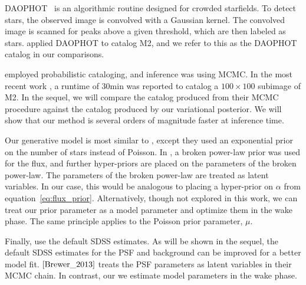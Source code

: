 DAOPHOT~\cite{stetson2987daophot} is an algorithmic routine designed for crowded starfields. To detect stars, the observed image is convolved with a Gaussian kernel. The convolved image is scanned for peaks above a given threshold, which are then labeled as stars. \cite{An_2008_m2} applied DAOPHOT to catalog M2, and we refer to this as the DAOPHOT catalog in our comparisons. 

\cite{Brewer_2013, Portillo_2017, Feder_2019} employed probabilistic cataloging, and inference was using MCMC. In the most recent work \cite{Feder_2019}, a runtime of 30min was reported to catalog a $100 \times 100$ subimage of M2. In the sequel, we will compare the catalog produced from their MCMC procedure against the catalog produced by our variational posterior. We will show that our method is several orders of magnitude faster at inference time. 

Our generative model is most similar to \cite{Portillo_2017, Feder_2019}, except they used an exponential prior on the number of stars instead of Poisson. 
In \cite{Brewer_2013}, a broken power-law prior was used for the flux, and further hyper-priors are placed on the parameters of the broken power-law. The parameters of the broken power-law are treated as latent variables. In our case, this would be analogous to placing a hyper-prior on $\alpha$ from equation~\eqref{eq:flux_prior}. 
Alternatively, though not explored in this work, we can treat our prior parameter as a model parameter and optimize them in the wake phase. The same principle applies to the Poisson prior parameter, $\mu$. 

Finally, \cite{Portillo_2017, Feder_2019} use the default SDSS estimates. As will be shown in the sequel, the default SDSS estimates for the PSF and background can be improved for a better model fit. $\cite{Brewer_2013}$ treats the PSF parameters as latent variables in their MCMC chain. In contrast, 
our we estimate model parameters in the wake phase. 